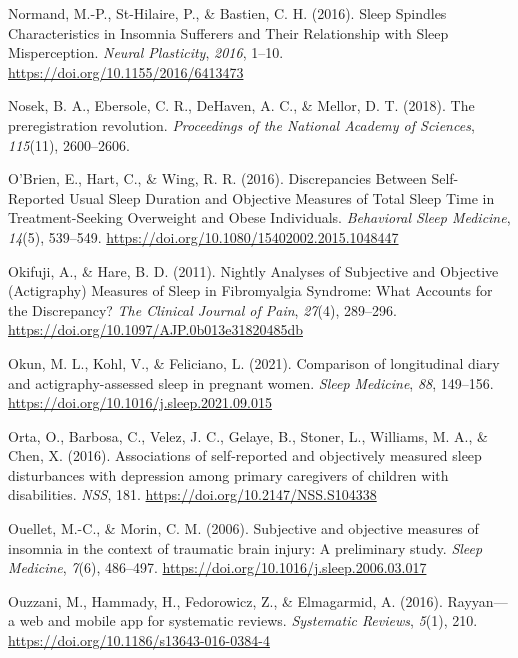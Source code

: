 \documentclass[
]{article}
\newlength{\cslhangindent}
\newenvironment{CSLReferences}[2] %
 {\begin{list}{}{%
  \setlength{\itemindent}{0pt}
  \setlength{\leftmargin}{0pt}
  \setlength{\parsep}{0pt}
  \ifodd #1
   \setlength{\leftmargin}{\cslhangindent}
   \setlength{\itemindent}{-1\cslhangindent}
  \fi
  \setlength{\itemsep}{#2\baselineskip}}}
 {\end{list}}
\begin{document}
\begin{CSLReferences}{1}{0}
Normand, M.-P., St-Hilaire, P., \& Bastien, C. H. (2016). Sleep {Spindles} {Characteristics} in {Insomnia} {Sufferers} and {Their} {Relationship} with {Sleep} {Misperception}. \emph{Neural Plasticity}, \emph{2016}, 1--10. \url{https://doi.org/10.1155/2016/6413473}

Nosek, B. A., Ebersole, C. R., DeHaven, A. C., \& Mellor, D. T. (2018). The preregistration revolution. \emph{Proceedings of the National Academy of Sciences}, \emph{115}(11), 2600--2606.

O'Brien, E., Hart, C., \& Wing, R. R. (2016). Discrepancies {Between} {Self}-{Reported} {Usual} {Sleep} {Duration} and {Objective} {Measures} of {Total} {Sleep} {Time} in {Treatment}-{Seeking} {Overweight} and {Obese} {Individuals}. \emph{Behavioral Sleep Medicine}, \emph{14}(5), 539--549. \url{https://doi.org/10.1080/15402002.2015.1048447}

Okifuji, A., \& Hare, B. D. (2011). Nightly {Analyses} of {Subjective} and {Objective} ({Actigraphy}) {Measures} of {Sleep} in {Fibromyalgia} {Syndrome}: {What} {Accounts} for the {Discrepancy}? \emph{The Clinical Journal of Pain}, \emph{27}(4), 289--296. \url{https://doi.org/10.1097/AJP.0b013e31820485db}

Okun, M. L., Kohl, V., \& Feliciano, L. (2021). Comparison of longitudinal diary and actigraphy-assessed sleep in pregnant women. \emph{Sleep Medicine}, \emph{88}, 149--156. \url{https://doi.org/10.1016/j.sleep.2021.09.015}

Orta, O., Barbosa, C., Velez, J. C., Gelaye, B., Stoner, L., Williams, M. A., \& Chen, X. (2016). Associations of self-reported and objectively measured sleep disturbances with depression among primary caregivers of children with disabilities. \emph{NSS}, 181. \url{https://doi.org/10.2147/NSS.S104338}

Ouellet, M.-C., \& Morin, C. M. (2006). Subjective and objective measures of insomnia in the context of traumatic brain injury: {A} preliminary study. \emph{Sleep Medicine}, \emph{7}(6), 486--497. \url{https://doi.org/10.1016/j.sleep.2006.03.017}

Ouzzani, M., Hammady, H., Fedorowicz, Z., \& Elmagarmid, A. (2016). Rayyan---a web and mobile app for systematic reviews. \emph{Systematic Reviews}, \emph{5}(1), 210. \url{https://doi.org/10.1186/s13643-016-0384-4}


\end{CSLReferences}
\end{document}
